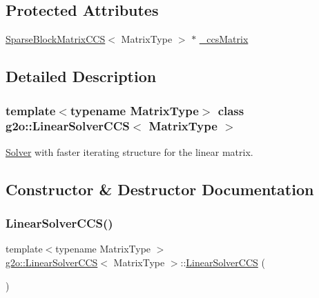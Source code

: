 \subsection*{Protected Attributes}
\begin{DoxyCompactItemize}
\item 
\mbox{\hyperlink{classg2o_1_1_sparse_block_matrix_c_c_s}{Sparse\+Block\+Matrix\+C\+CS}}$<$ Matrix\+Type $>$ $\ast$ \mbox{\hyperlink{classg2o_1_1_linear_solver_c_c_s_a07f0df9a6012d567e26a89063c53aa12}{\+\_\+ccs\+Matrix}}
\end{DoxyCompactItemize}


\subsection{Detailed Description}
\subsubsection*{template$<$typename Matrix\+Type$>$\newline
class g2o\+::\+Linear\+Solver\+C\+C\+S$<$ Matrix\+Type $>$}

\mbox{\hyperlink{classg2o_1_1_solver}{Solver}} with faster iterating structure for the linear matrix. 

\subsection{Constructor \& Destructor Documentation}
\mbox{\label{classg2o_1_1_linear_solver_c_c_s_aa4a8b0612a60769481c40d2d1a6b03ce}} 
\subsubsection{\texorpdfstring{Linear\+Solver\+C\+C\+S()}{LinearSolverCCS()}}
{\footnotesize\ttfamily template$<$typename Matrix\+Type $>$ \\
\mbox{\hyperlink{classg2o_1_1_linear_solver_c_c_s}{g2o\+::\+Linear\+Solver\+C\+CS}}$<$ Matrix\+Type $>$\+::\mbox{\hyperlink{classg2o_1_1_linear_solver_c_c_s}{Linear\+Solver\+C\+CS}} (\begin{DoxyParamCaption}{ }\end{DoxyParamCaption})\hspace{0.3cm}{\ttfamily [inline]}}

